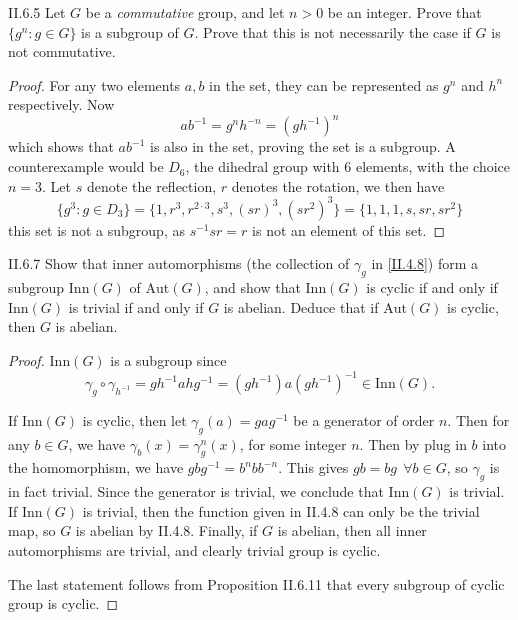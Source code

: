 \begin{problem}{II.6.5}
Let $G$ be a \emph{commutative} group, and let $n>0$ be an integer. Prove that $\{g^n : g \in G\}$ is a subgroup of $G$. Prove that this is not necessarily the case if $G$ is not commutative. 
\end{problem}
\begin{proof}
For any two elements $a,b$ in the set, they can be represented as $g^n$ and $h^n$ respectively. Now 
\[
ab^{-1} = g^nh^{-n} = (gh^{-1})^n
\]
which shows that $ab^{-1}$ is also in the set, proving the set is a subgroup. A counterexample would be $D_6$, the dihedral group with $6$ elements, with the choice $n = 3$. Let $s$ denote the reflection, $r$ denotes the rotation, we then have 
\[
\{g^3 : g \in D_3\} = \{1, r^3, r^{2 \cdot 3}, s^3, (sr)^3, (sr^2)^3\} = \{1, 1, 1, s, sr, sr^2\}
\]
this set is not a subgroup, as $s^{-1}sr = r$ is not an element of this set.
\end{proof}

\begin{problem}{II.6.7}
Show that inner automorphisms (the collection of $\gamma_g$ in \ref{II.4.8}) form a subgroup $\text{Inn}(G)$ of $\text{Aut}(G)$, and show that $\text{Inn}(G)$ is cyclic if and only if $\text{Inn}(G)$ is trivial if and only if $G$ is abelian. Deduce that if $\text{Aut}(G)$ is cyclic, then $G$ is abelian.
\end{problem}
\begin{proof}
$\text{Inn}(G)$ is a subgroup since
\[
\gamma_g \circ \gamma_{h^{-1}} = gh^{-1}ahg^{-1} = (gh^{-1})a(gh^{-1})^{-1} \in \text{Inn}(G).
\]

If $\text{Inn}(G)$ is cyclic, then let $\gamma_g(a) = gag^{-1}$ be a generator of order $n$. Then for any $b \in G$, we have $\gamma_b(x) = \gamma_g^n(x)$, for some integer $n$. Then by plug in $b$ into the homomorphism, we have $gbg^{-1} = b^nbb^{-n}$. This gives $gb = bg \:\: \forall b \in G$, so $\gamma_g$ is in fact trivial. Since the generator is trivial, we conclude that $\text{Inn}(G)$ is trivial. If $\text{Inn}(G)$ is trivial, then the function given in II.4.8 can only be the trivial map, so $G$ is abelian by II.4.8. Finally, if $G$ is abelian, then all inner automorphisms are trivial, and clearly trivial group is cyclic.

The last statement follows from Proposition II.6.11 that every subgroup of cyclic group is cyclic.
\end{proof}

